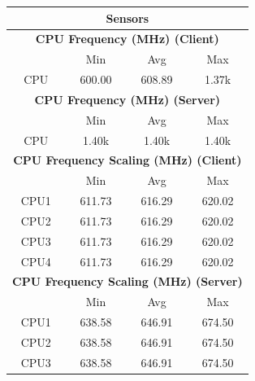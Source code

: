 \documentclass[11pt,a4paper]{scrreprt}
\begin{document}
\begin{table}[H]
\centering
    \begin{tabular}{||c|c|c|c|c|c|c||}
    \hline
    \multicolumn{7}{|c|}{\textbf{Sensors}} \\
    \hline
    \multicolumn{7}{|c|}{\textbf{CPU Frequency (MHz) (Client)}} \\
    \hline\hline
      & \multicolumn{2}{|c|}{Min} & \multicolumn{2}{|c|}{Avg} & \multicolumn{2}{|c|}{Max} \\
    \hline
    CPU & \multicolumn{2}{|c|}{600.00} & \multicolumn{2}{|c|}{608.89} & \multicolumn{2}{|c|}{1.37k} \\
    \hline\hline
    \multicolumn{7}{|c|}{\textbf{CPU Frequency (MHz) (Server)}} \\
    \hline\hline
      & \multicolumn{2}{|c|}{Min} & \multicolumn{2}{|c|}{Avg} & \multicolumn{2}{|c|}{Max} \\
    \hline
    CPU & \multicolumn{2}{|c|}{1.40k} & \multicolumn{2}{|c|}{1.40k} & \multicolumn{2}{|c|}{1.40k} \\
    \hline\hline
    \multicolumn{7}{|c|}{\textbf{CPU Frequency Scaling (MHz) (Client)}} \\
    \hline
      & \multicolumn{2}{|c|}{Min} & \multicolumn{2}{|c|}{Avg} & \multicolumn{2}{|c|}{Max} \\
    \hline
    CPU1 & \multicolumn{2}{|c|}{611.73} & \multicolumn{2}{|c|}{616.29} & \multicolumn{2}{|c|}{620.02} \\
    \hline
    CPU2 & \multicolumn{2}{|c|}{611.73} & \multicolumn{2}{|c|}{616.29} & \multicolumn{2}{|c|}{620.02} \\
    \hline
    CPU3 & \multicolumn{2}{|c|}{611.73} & \multicolumn{2}{|c|}{616.29} & \multicolumn{2}{|c|}{620.02} \\
    \hline
    CPU4 & \multicolumn{2}{|c|}{611.73} & \multicolumn{2}{|c|}{616.29} & \multicolumn{2}{|c|}{620.02} \\
    \hline\hline
    \multicolumn{7}{|c|}{\textbf{CPU Frequency Scaling (MHz) (Server)}} \\
    \hline
      & \multicolumn{2}{|c|}{Min} & \multicolumn{2}{|c|}{Avg} & \multicolumn{2}{|c|}{Max} \\
    \hline
    CPU1 & \multicolumn{2}{|c|}{638.58} & \multicolumn{2}{|c|}{646.91} & \multicolumn{2}{|c|}{674.50} \\
    \hline
    CPU2 & \multicolumn{2}{|c|}{638.58} & \multicolumn{2}{|c|}{646.91} & \multicolumn{2}{|c|}{674.50} \\
    \hline
    CPU3 & \multicolumn{2}{|c|}{638.58} & \multicolumn{2}{|c|}{646.91} & \multicolumn{2}{|c|}{674.50} \\

\end{tabular}
\end{table}
\end{document}
